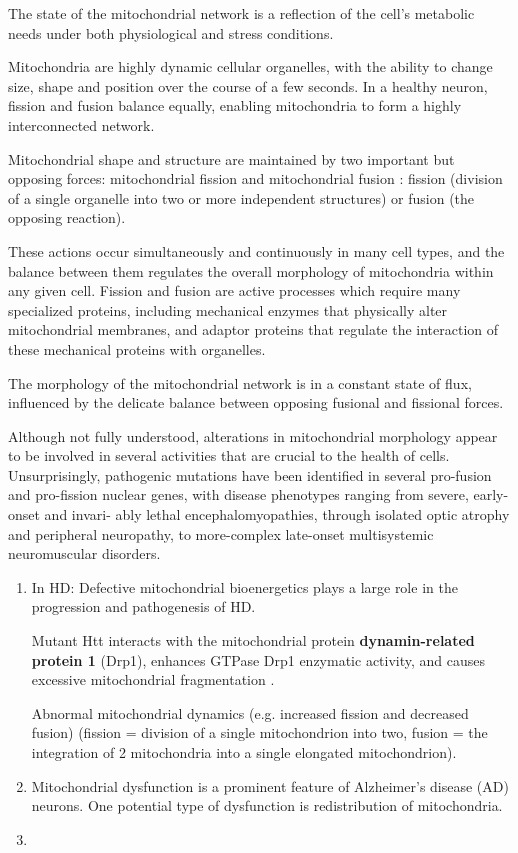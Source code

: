 The state of the mitochondrial network is a reflection of the cell’s metabolic
needs under both physiological and stress conditions.

Mitochondria are highly dynamic cellular organelles, with the ability to change
size, shape and position over the course of a few seconds.
In a healthy neuron, fission and fusion balance equally, enabling mitochondria
to form a highly interconnected network.

Mitochondrial shape and structure are maintained by two important but opposing
forces: mitochondrial fission and mitochondrial fusion \citep{reddy2012}:
fission (division of a single organelle into two or more independent structures)
or fusion (the opposing reaction).

These actions occur simultaneously and continuously in many cell types, and the
balance between them regulates the overall morphology of mitochondria within any
given cell.
Fission and fusion are active processes which require many specialized proteins,
including mechanical enzymes that physically alter mitochondrial membranes, and
adaptor proteins that regulate the interaction of these mechanical proteins with
organelles.

The morphology of the mitochondrial network is in a constant state of flux,
influenced by the delicate balance between opposing fusional and fissional
forces.

Although not fully understood, alterations in mitochondrial morphology appear to
be involved in several activities that are crucial to the health of cells.
Unsurprisingly, pathogenic mutations have been identified in several pro-fusion
and pro-fission nuclear genes, with disease phenotypes ranging from severe,
early-onset and invari- ably lethal encephalomyopathies, through isolated optic
atrophy and peripheral neuropathy, to more-complex late-onset multisystemic
neuromuscular disorders.

\begin{enumerate}

  \item In HD:  Defective mitochondrial bioenergetics plays a large role in the progression and
 pathogenesis of HD.

  
Mutant Htt interacts with the mitochondrial protein {\bf dynamin-related protein
1} (Drp1), enhances GTPase Drp1 enzymatic activity, and causes excessive
mitochondrial fragmentation \citep{reddy2012}.

Abnormal mitochondrial dynamics (e.g. increased
fission and decreased fusion) (fission = division of a single mitochondrion into
two, fusion = the integration of 2 mitochondria into a single elongated
mitochondrion).

  \item Mitochondrial dysfunction is a prominent feature of Alzheimer's disease (AD)
neurons. One potential type of dysfunction is redistribution of mitochondria.

  \item 
\end{enumerate}


